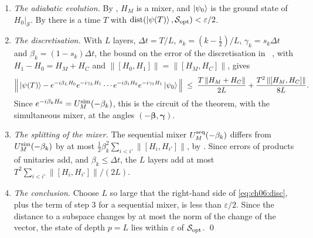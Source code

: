 \documentclass[handoutsbeamer.tex]{subfiles}
\begin{document}
\begin{frame}
\onp{\scriptsize}
\begin{enumerate}\setlength\itemsep{0.15em}
    \item \emph{The adiabatic evolution.} By , $H_M$ is a mixer, and $\ket{\psi_0}$ is the ground state of $H_0|_{\mathcal S}$. By  there is a time $T$ with $\operatorname{dist}(\ket{\psi(T)},\mathcal S_{\rm opt})<\varepsilon/2$.
    \item \emph{The discretisation.} With $L$ layers, $\Delta t = T/L$, $s_k = (k-\frac12)/L$, $\gamma_k = s_k\Delta t$ and $\beta_k = (1-s_k)\Delta t$, the bound on the error of the discretisation in \Chap~, with $H_1 - H_0 = H_M + H_C$ and $\|[H_0,H_1]\| = \|[H_M,H_C]\|$, gives
    \begin{equation}\label{eq:ch06:disc}
        \Big\|\ket{\psi(T)} - e^{-i\beta_LH_0}e^{-i\gamma_LH_1}\cdots e^{-i\beta_1H_0}e^{-i\gamma_1H_1}\ket{\psi_0}\Big\| \;\le\; \frac{T\,\|H_M + H_C\|}{2L} + \frac{T^2\,\|[H_M,H_C]\|}{8L}.
    \end{equation}
    Since $e^{-i\beta_kH_0} = U_M^{\rm sim}(-\beta_k)$, this is the circuit of the theorem, with the simultaneous mixer, at the angles $(-\boldsymbol\beta,\boldsymbol\gamma)$.
    \item \emph{The splitting of the mixer.} The sequential mixer $U_M^{\rm seq}(-\beta_k)$ differs from $U_M^{\rm sim}(-\beta_k)$ by at most $\frac12\beta_k^2\sum_{i<i'}\|[H_i,H_{i'}]\|$, by . Since errors of products of unitaries add, and $\beta_k\le\Delta t$, the $L$ layers add at most $T^2\sum_{i<i'}\|[H_i,H_{i'}]\|/(2L)$.
    \item \emph{The conclusion.} Choose $L$ so large that the right-hand side of \eqref{eq:ch06:disc}, plus the term of step 3 for a sequential mixer, is less than $\varepsilon/2$. Since the distance to a subspace changes by at most the norm of the change of the vector, the state of depth $p = L$ lies within $\varepsilon$ of $\mathcal S_{\rm opt}$. \qed
\end{enumerate}
\end{frame}
\end{document}
